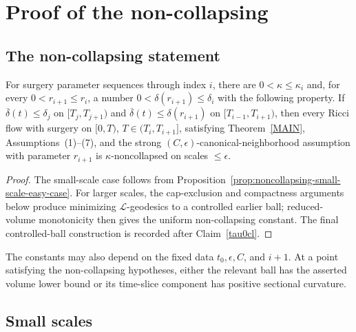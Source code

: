 \chapter{Proof of the non-collapsing}
\label{chap:proof-noncollapsing}
\label{sectnoncoll}

\section{The non-collapsing statement}

\begin{proposition}
\label{prop:kappa-limit-noncollapsing}
\label{KAPPALIMIT}
For surgery parameter sequences through index $i$, there are $0<\kappa\leq\kappa_i$ and, for every $0<r_{i+1}\leq r_i$, a number $0<\delta(r_{i+1})\leq\delta_i$ with the following property. If $\overline\delta(t)\leq\delta_j$ on $[T_j,T_{j+1})$ and $\overline\delta(t)\leq\delta(r_{i+1})$ on $[T_{i-1},T_{i+1})$, then every Ricci flow with surgery on $[0,T)$, $T\in(T_i,T_{i+1}]$, satisfying Theorem~\ref{MAIN}, Assumptions~(1)--(7), and the strong $(C,\epsilon)$-canonical-neighborhood assumption with parameter $r_{i+1}$ is $\kappa$-noncollapsed on scales $\leq\epsilon$.
\end{proposition}
\begin{proof}
\sketch
The small-scale case follows from Proposition~\ref{prop:noncollapsing-small-scale-easy-case}. For larger scales, the cap-exclusion and compactness arguments below produce minimizing $\mathcal L$-geodesics to a controlled earlier ball; reduced-volume monotonicity then gives the uniform non-collapsing constant. The final controlled-ball construction is recorded after Claim~\ref{tau0cl}.
\end{proof}

\begin{remark}
\label{rem:kappa-delta-dependence}
The constants may also depend on the fixed data $t_0,\epsilon,C$, and $i+1$. At a point satisfying the non-collapsing hypotheses, either the relevant ball has the asserted volume lower bound or its time-slice component has positive sectional curvature.
\end{remark}

\section{Small scales}
\label{rsmall}


